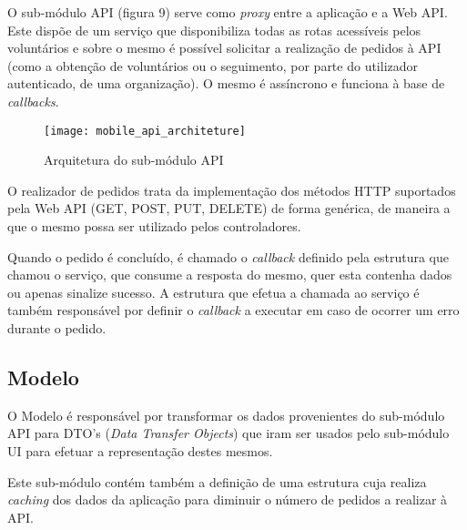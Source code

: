 O sub-módulo API (figura 9) serve como \textit{proxy} entre a aplicação e a Web API. Este dispõe de um serviço que disponibiliza todas as rotas acessíveis pelos voluntários e sobre o mesmo é possível solicitar a realização de pedidos à API (como a obtenção de voluntários ou o seguimento, por parte do utilizador autenticado, de uma organização). O mesmo é assíncrono e funciona à base de \textit{callbacks}.

\begin{figure}[h]
	\centering
	\texttt{[image: mobile\_api\_architeture]}
	\caption{Arquitetura do sub-módulo API}
\end{figure}

O realizador de pedidos trata da implementação dos métodos HTTP suportados pela Web API (GET, POST, PUT, DELETE) de forma genérica, de maneira a que o mesmo possa ser utilizado pelos controladores.

Quando o pedido é concluído, é chamado o \textit{callback} definido pela estrutura que chamou o serviço, que consume a resposta do mesmo, quer esta contenha dados ou apenas sinalize sucesso. A estrutura que efetua a chamada ao serviço é também responsável por definir o \textit{callback} a executar em caso de ocorrer um erro durante o pedido.

\subsection{Modelo}

O Modelo é responsável por transformar os dados provenientes do sub-módulo API para DTO's (\textit{Data Transfer Objects}) que iram ser usados pelo sub-módulo UI para efetuar a representação destes mesmos.

\medskip

Este sub-módulo contém também a definição de uma estrutura cuja realiza \textit{caching} dos dados da aplicação para diminuir o número de pedidos a realizar à API.
